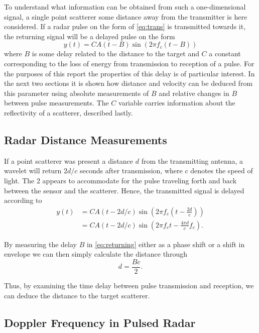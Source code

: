 To understand what information can be obtained from such a one-dimensional signal, a single point scatterer some distance away from the transmitter is here considered. If a radar pulse on the form of \eqref{eq:trans} is transmitted towards it, the returning signal will be a delayed pulse on the form \citep{richards_2014}
\begin{equation}\label{eq:returning}
	y(t) = CA(t-B)\sin(2\pi f_c (t-B))
\end{equation}
where $B$ is some delay related to the distance to the target and $C$ a constant corresponding to the loss of energy from transmission to reception of a pulse. For the purposes of this report the properties of this delay is of particular interest. In the next two sections it is shown how distance and velocity can be deduced from this parameter using absolute measurements of $B$ and relative changes in $B$ between pulse measurements. The $C$ variable carries information about the reflectivity of a scatterer, described lastly. 

\subsection{Radar Distance Measurements}

If a point scatterer was present a distance $d$ from the transmitting antenna, a wavelet will return $2d/c$ seconds after transmission, where $c$ denotes the speed of light. The 2 appears to accommodate for the pulse traveling forth and back between the sensor and the scatterer. Hence, the transmitted signal is delayed according to 
\begin{equation}
	\begin{split}
		y(t) 
		& = CA(t-2d/c)\sin(2\pi f_c(t - \frac{2d}{c})) \\
		& = CA(t-2d/c)\sin(2\pi f_ct - \frac{4\pi d}{c}f_c).
	\end{split}
\end{equation}

By measuring the delay $B$ in \eqref{eq:returning} either as a phase shift or a shift in envelope we can then simply calculate the distance through
\begin{equation}
	d = \frac{Bc}{2}.
\end{equation}

Thus, by examining the time delay between pulse transmission and reception, we can deduce the distance to the target scatterer. 

\subsection{Doppler Frequency in Pulsed Radar}\label{sec:doppler}
\label{doppler}

